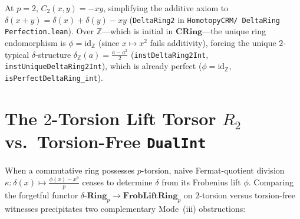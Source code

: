 At $p = 2$, $C_2(x, y) = -xy$, simplifying the additive axiom to $\delta(x + y) = \delta(x) + \delta(y) - xy$ (\texttt{DeltaRing2} in \texttt{HomotopyCRM/ DeltaRing Perfection.lean}). Over $\mathbb{Z}$---which is initial in $\mathbf{CRing}$---the unique ring endomorphism is $\phi = \mathrm{id}_{\mathbb{Z}}$ (since $x \mapsto x^2$ fails additivity), forcing the unique $2$-typical $\delta$-structure $\delta_{\mathbb{Z}}(a) = \frac{a - a^2}{2}$ (\texttt{instDeltaRing2Int}, \texttt{instUniqueDeltaRing2Int}), which is already perfect ($\phi = \mathrm{id}_{\mathbb{Z}}$, \texttt{isPerfectDeltaRing\_int}).

\section{The $2$-Torsion Lift Torsor $R_2$ vs.\ Torsion-Free \texttt{DualInt}}\label{sec:r2-vs-dualint}

When a commutative ring possesses $p$-torsion, naive Fermat-quotient division $\kappa : \delta(x) \mapsto \frac{\phi(x) - x^p}{p}$ ceases to determine $\delta$ from its Frobenius lift $\phi$. Comparing the forgetful functor $\delta\text{-}\mathbf{Ring}_p \to \mathbf{FrobLiftRing}_p$ on $2$-torsion versus torsion-free witnesses precipitates two complementary Mode~(iii) obstructions:

